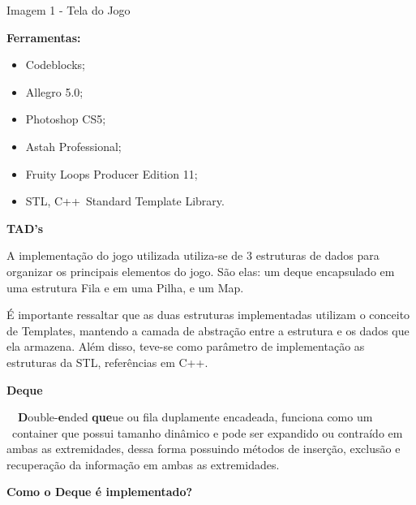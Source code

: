\documentclass[a4paper]{article}
\newcommand\liststyleLSi{%
\renewcommand\labelitemi{\ding{108}}
\renewcommand\labelitemii{o}
\renewcommand\labelitemiii{{\FilledSmallSquare}}
\renewcommand\labelitemiv{\ding{108}}
}
\begin{document}
\bigskip


\bigskip


\bigskip

{\centering\color{black}
Imagem 1 - Tela do Jogo
\par}


\bigskip

{\color{black}
\textbf{Ferramentas:}}

\liststyleLSi
\begin{itemize}
\item {\color{black}
Codeblocks;}
\item {\color{black}
Allegro 5.0;}
\item {\color{black}
Photoshop CS5;}
\item {\color{black}
Astah Professional;}
\item {\color{black}
Fruity Loops Producer Edition 11;}
\item {\color{black}
STL, C++~Standard Template Library. }
\end{itemize}

\bigskip

{\color{black}
\textbf{TAD’s}}


\bigskip

{\color{black}
A implementação do jogo utilizada utiliza-se de 3 estruturas de dados
para organizar os principais elementos do jogo. São elas: um deque
encapsulado em uma estrutura Fila e em uma Pilha, e um Map.}

{\color{black}
É importante ressaltar que as duas estruturas implementadas utilizam o
conceito de Templates, mantendo a camada de abstração entre a estrutura
e os dados que ela armazena. Além disso, teve-se como parâmetro de
implementação as estruturas da STL, referências em C++.}


\bigskip

{\bfseries\color{black}
Deque}


\bigskip


\bigskip

{\color{black}
\ \ \textbf{D}ouble-\textbf{e}nded \textbf{que}ue ou fila duplamente
encadeada, funciona como um
\textcolor[rgb]{0.13333334,0.13333334,0.13333334}{\ container que
possui tamanho dinâmico e pode ser expandido ou contraído em ambas as
extremidades, dessa forma possuindo métodos de inserção, exclusão e
recuperação da informação em ambas as extremidades.}}


\bigskip

{\color{black}
\textbf{\textcolor[rgb]{0.13333334,0.13333334,0.13333334}{Como o Deque é
implementado?}}}
\end{document}
